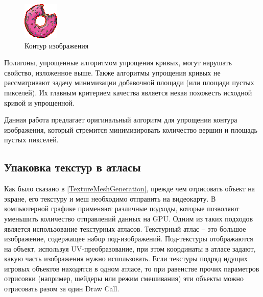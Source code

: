 \documentclass{fefu_thesis/cls/fefu}
\begin{document}
    \begin{figure}[H]
        \centering
        \includegraphics[scale=3]{images/donutpixel_contour_none.png}
        \caption{Контур изображения}
    \end{figure}

    Полигоны, упрощенные алгоритмом упрощения кривых, могут нарушать свойство, изложенное выше. Также алгоритмы упрощения кривых не рассматривают задачу минимизации добавочной площади (или площади пустых пикселей). Их главным критерием качества является некая похожесть исходной кривой и упрощенной.

    Данная работа предлагает оригинальный алгоритм для упрощения контура изображения, который стремится минимизировать количество вершин и площадь пустых пикселей.

    \subsection{Упаковка текстур в атласы}

    Как было сказано в \ref{TextureMeshGeneration}, прежде чем отрисовать объект на экране, его текстуру и меш необходимо отправить на видеокарту. В компьютерной графике применяют различные подходы, которые позволяют уменьшить количество отправлений данных на GPU. Одним из таких подходов является использование текстурных атласов. Текстурный атлас -- это большое изображение, содержащее набор под-изображений. Под-текстуры отображаются на объект, используя UV-преобразование, при этом координаты в атласе задают, какую часть изображения нужно использовать. Если текстуры подряд идущих игровых объектов находятся в одном атласе, то при равенстве прочих параметров отрисовки (например, шейдеры или режим смешивания) эти объекты можно отрисовать разом за один Draw Call.
\end{document}
